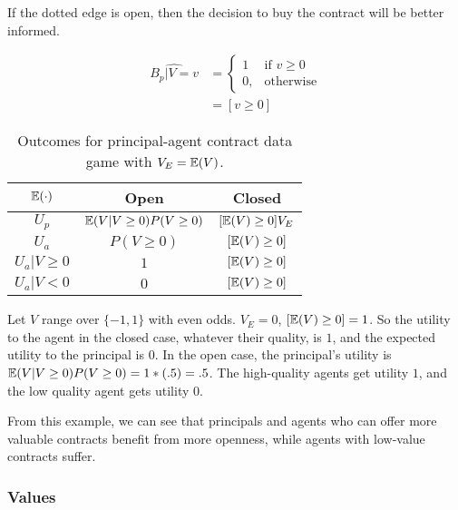 \documentclass[../thesis.tex]{subfiles}
\begin{document}
If the dotted edge is open, then the decision to buy
the contract will be better informed.

\begin{equation}
  \begin{split}
    \hat{B_p \vert V = v} & = \begin{cases}
      1 & \text{if } v \geq 0 \\
      0, & \text{otherwise}
    \end{cases} \\
    & = [v \geq 0]
  \end{split}
\end{equation}

\begin{table}
\begin{center}
\begin{tabular}{ |c|c|c| } 
 \hline
  $\mathbb{E}(\cdot)$ & Open & Closed \\
 \hline
 $U_p$ & $\mathbb{E}(V \vert V \geq 0) P(V \geq 0)$ & $[\mathbb{E}(V) \geq 0] V_E$  \\ 
 $U_a$ & $P(V \geq 0)$ & $[\mathbb{E}(V) \geq 0]$  \\
 $U_a \vert V \geq 0$ & $1$ & $[\mathbb{E}(V) \geq 0]$  \\
 $U_a \vert V < 0$ & $0$ & $[\mathbb{E}(V) \geq 0]$  \\
 \hline
\end{tabular}
\end{center}
\caption{Outcomes for principal-agent contract data game with $V_E = \mathbb{E}(V)$.}
\end{table} 

\begin{exm}
  Let $V$ range over $\{-1,1\}$ with even odds.
    $V_E = 0$, $[\mathbb{E}(V) \geq 0] = 1$.
    So the utility to the agent in the closed case, whatever their quality,
    is $1$, and the expected utility to the principal is $0$.
    In the open case, the principal's utility is
    $\mathbb{E}(V \vert V \geq 0) P(V \geq 0) = 1 * (.5) = .5$.
    The high-quality agents get utility $1$, and the low
    quality agent gets utility $0$.
\end{exm}

From this example, we can see that principals and agents
who can offer more valuable contracts benefit from more
openness, while agents with low-value contracts suffer.


\subsubsection{Values}
\end{document}
